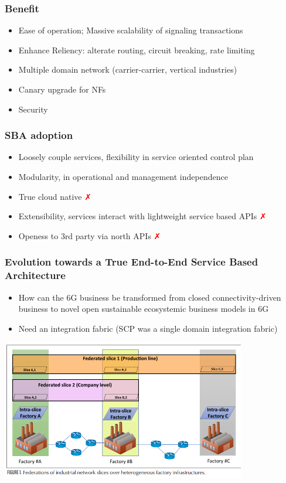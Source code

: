 \documentclass{beamer}
\begin{document}
\begin{frame}
\frametitle{Benefit}
\begin{itemize}
  \item Ease of operation; Massive scalability of signaling transactions
  \item Enhance Reliency: alterate routing, circuit breaking, rate limiting
  \item Multiple domain network (carrier-carrier, vertical industries)
  \item Canary upgrade for NFs
  \item Security
\end{itemize}
\end{frame}

\begin{frame}
  \frametitle {SBA adoption}
  \begin{itemize}
    \item {Loosely couple services, flexibility in service oriented control plan \textcolor{green}{\faCheckCircle}}
    \item {Modularity, in operational and management independence \textcolor{green}{\faCheckCircle}}
    \item {True cloud native \textcolor{red}{\faClose}}
    \item {Extensibility, services interact with lightweight service based APIs \textcolor{red}{\faClose}}
    \item {Openess to 3rd party via north APIs \textcolor{red}{\faClose}}
  \end{itemize}
\end{frame}

\begin{frame}
  \frametitle{Evolution towards a True End-to-End Service Based Architecture}
  \begin{itemize}
    \item{How can the
6G business be transformed from closed connectivity-driven business to novel open sustainable ecosystemic business models in 6G}
    \item Need an integration fabric (SCP was a single domain integration fabric)
  \end{itemize}
  \center
  \includegraphics[width=0.8\textwidth]{images/fabric}
\end{frame}
\end{document}
